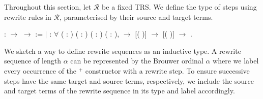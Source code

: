 Throughout this section, let $\mathcal{R}$ be a fixed TRS. We define
the type of steps using rewrite rules in $\mathcal{R}$, parameterised
by their source and target terms.
\begin{singlespace}
\begin{coqdoccode}
\coqdocnoindent
{}  :
 \ensuremath{\rightarrow}
 \ensuremath{\rightarrow}
 :=\coqdoceol
\coqdocindent{1.00em}
\ensuremath{|}  :
\ensuremath{\forall} (  :
) (\coqdocvar{$\rho$} :
) ( :
) (\coqdocvar{$\sigma$} :
),\coqdoceol
\coqdocindent{6.50em} \coqdocvariable{$\rho$}
 \ensuremath{\rightarrow}\coqdoceol
\coqdocindent{6.50em}
[(
\coqdocvariable{$\rho$})\coqdocvariable{$^\sigma$}]  
\ensuremath{\rightarrow}\coqdoceol
\coqdocindent{6.50em}
[(
\coqdocvariable{$\rho$})\coqdocvariable{$^\sigma$}]  
\ensuremath{\rightarrow}\coqdoceol
\coqdocindent{6.50em}
 
.\coqdoceol
\end{coqdoccode}
\end{singlespace}
We sketch a way to define rewrite sequences as an inductive type. A rewrite
sequence of length $\alpha$ can be represented by the Brouwer ordinal $\alpha$
where we label every occurrence of the $^+$ constructor with a rewrite
step. To ensure successive steps have the same target and source terms,
respectively, we include the source and target terms of the rewrite sequence
in its type and label accordingly.

